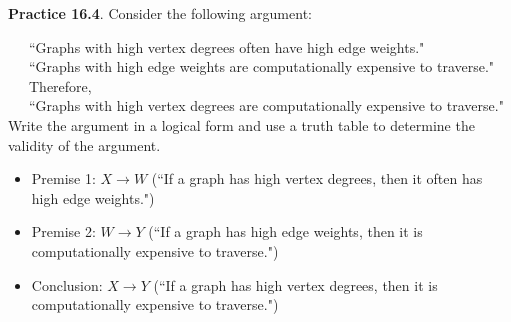 \documentclass[aspectratio=169]{beamer}
\begin{document}
\begin{frame}[plain]{}

{\bf Practice 16.4}.
   Consider the following argument:\\
  \smallskip
  
   \ \ \ ``Graphs with high vertex degrees often have high edge weights."\\
   \ \ \ ``Graphs with high edge weights are computationally expensive to traverse."\\
   \ \ \  Therefore,\\
   \ \ \  ``Graphs with high vertex degrees are computationally expensive to traverse."\\ 
   \medskip
 Write the argument in a logical form and   
  use a truth table to determine the validity of the argument.\pause
  \medskip
  
  \begin{itemize}
    \item Premise 1: $X\rightarrow W$
   (``If a graph has high vertex degrees, then it often has high edge weights.")
   \item Premise 2: $W\rightarrow Y$
  (``If a graph has high edge weights, then it is computationally expensive to traverse.")
   \item Conclusion: $X\rightarrow Y$
   (``If a graph has high vertex degrees, then it is computationally expensive to traverse.")
  \end{itemize}
  
  
 \end{frame}
 
\end{document}
